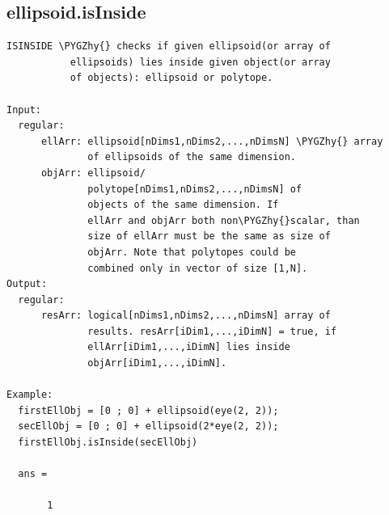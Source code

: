 \documentclass[letterpaper,10pt,english]{sphinxmanual}
\def\PYGZhy{\char`\-}
\begin{document}
\subsection{ellipsoid.isInside}
\label{chap_functions:ellipsoid-isinside}
\begin{Verbatim}[commandchars=\\\{\}]
ISINSIDE \PYGZhy{} checks if given ellipsoid(or array of
           ellipsoids) lies inside given object(or array
           of objects): ellipsoid or polytope.

Input:
  regular:
      ellArr: ellipsoid[nDims1,nDims2,...,nDimsN] \PYGZhy{} array
              of ellipsoids of the same dimension.
      objArr: ellipsoid/
              polytope[nDims1,nDims2,...,nDimsN] of
              objects of the same dimension. If
              ellArr and objArr both non\PYGZhy{}scalar, than
              size of ellArr must be the same as size of
              objArr. Note that polytopes could be
              combined only in vector of size [1,N].
Output:
  regular:
      resArr: logical[nDims1,nDims2,...,nDimsN] array of
              results. resArr[iDim1,...,iDimN] = true, if
              ellArr[iDim1,...,iDimN] lies inside
              objArr[iDim1,...,iDimN].

Example:
  firstEllObj = [0 ; 0] + ellipsoid(eye(2, 2));
  secEllObj = [0 ; 0] + ellipsoid(2*eye(2, 2));
  firstEllObj.isInside(secEllObj)

  ans =

       1
\end{Verbatim}
\end{document}
